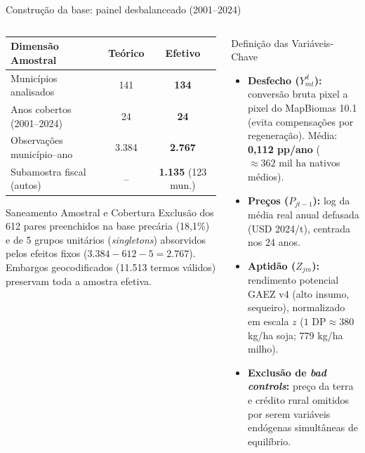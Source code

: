 \documentclass[aspectratio=169,10.5pt]{beamer}
\newcommand{\fonte}[1]{\par\vspace{1mm}{\fontsize{6.5}{7.5}\selectfont\color{gray}Fonte: #1\par}}
\begin{document}
\begin{frame}{Construção da base: painel desbalanceado (2001--2024)}
\begin{columns}[T]
\begin{column}{0.48\textwidth}
\fontsize{8}{9.5}\selectfont
\begin{tabularx}{\textwidth}{L c c}
\toprule
\textbf{Dimensão Amostral} & \textbf{Teórico} & \textbf{Efetivo}\\
\midrule
Municípios analisados & 141 & \textbf{134}\\
Anos cobertos (2001--2024) & 24 & \textbf{24}\\
Observações município--ano & 3.384 & \textbf{2.767}\\
Subamostra fiscal (autos) & -- & \textbf{1.135} (123 mun.)\\
\bottomrule
\end{tabularx}
\vspace{2mm}
\begin{block}{Saneamento Amostral e Cobertura}
\fontsize{7.8}{9.3}\selectfont
Exclusão dos 612 pares preenchidos na base precária (18,1\%) e de 5 grupos unitários (\textit{singletons}) absorvidos pelos efeitos fixos ($\text{3.384} - 612 - 5 = 2.767$). Embargos geocodificados (11.513 termos válidos) preservam toda a amostra efetiva.
\end{block}
\end{column}

\begin{column}{0.49\textwidth}
\begin{block}{Definição das Variáveis-Chave}
\fontsize{7.8}{9.4}\selectfont
\begin{itemize}
    \setlength{\itemsep}{0.9mm}
    \item \textbf{Desfecho ($Y_{mt}^d$):} conversão bruta pixel a pixel do MapBiomas 10.1 (evita compensações por regeneração). Média: \textbf{0,112 pp/ano} ($\approx 362\text{ mil ha}$ nativos médios).
    \item \textbf{Preços ($P_{jt-1}$):} log da média real anual defasada (USD 2024/t), centrada nos 24 anos.
    \item \textbf{Aptidão ($Z_{jm}$):} rendimento potencial GAEZ v4 (alto insumo, sequeiro), normalizado em escala $z$ ($1\text{ DP} \approx 380$ kg/ha soja; $779$ kg/ha milho).
    \item \textbf{Exclusão de \textit{bad controls}:} preço da terra e crédito rural omitidos por serem variáveis endógenas simultâneas de equilíbrio.
\end{itemize}
\end{block}
\end{column}
\end{columns}
\end{frame}
\end{document}
